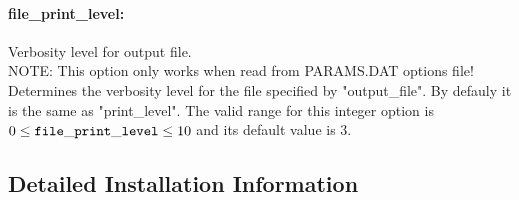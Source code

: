 \documentclass[letter,10pt]{article}
\begin{document}
\paragraph{file\_print\_level:} Verbosity level for output file. $\;$ \\
 NOTE: This option only works when read from
PARAMS.DAT options file! Determines the verbosity
level for the file specified by "output\_file". 
By defauly it is the same as "print\_level". The valid range for this integer option is
$0 \le {\tt file\_print\_level } \le 10$
and its default value is $3$.

\subsection{Detailed Installation Information}\label{ExpertInstall}
\end{document}
